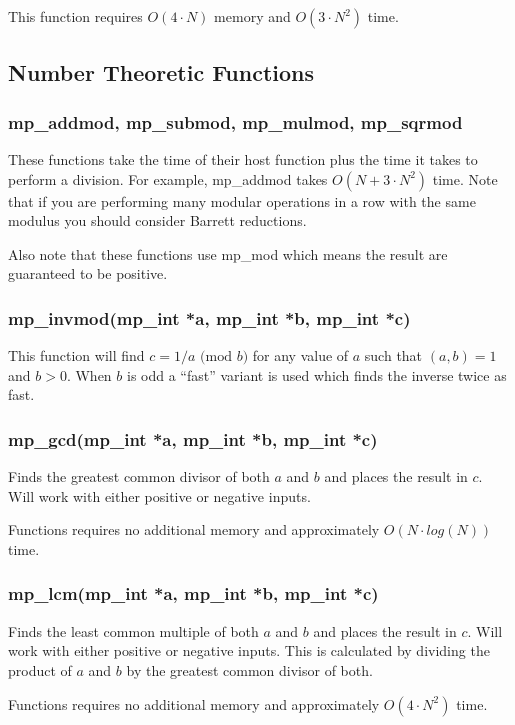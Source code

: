 \documentclass{article}
\begin{document}
This function requires $O(4 \cdot N)$ memory and $O(3 \cdot N^2)$ time.

\subsection{Number Theoretic Functions}

\subsubsection{mp\_addmod, mp\_submod, mp\_mulmod, mp\_sqrmod}
These functions take the time of their host function plus the time it takes to perform a division.  For example, 
mp\_addmod takes $O(N + 3 \cdot N^2)$ time.  Note that if you are performing many modular operations in a row with
the same modulus you should consider Barrett reductions.  

Also note that these functions use mp\_mod which means the result are guaranteed to be positive.

\subsubsection{mp\_invmod(mp\_int *a, mp\_int *b, mp\_int *c)}
This function will find $c = 1/a \mbox{ (mod }b\mbox{)}$ for any value of $a$ such that $(a, b) = 1$ and $b > 0$.  When
$b$ is odd a ``fast'' variant is used which finds the inverse twice as fast.  

\subsubsection{mp\_gcd(mp\_int *a, mp\_int *b, mp\_int *c)}
Finds the greatest common divisor of both $a$ and $b$ and places the result in $c$.  Will work with either positive
or negative inputs.  

Functions requires no additional memory and approximately $O(N \cdot log(N))$ time.

\subsubsection{mp\_lcm(mp\_int *a, mp\_int *b, mp\_int *c)}
Finds the least common multiple of both $a$ and $b$ and places the result in $c$.  Will work with either positive
or negative inputs.  This is calculated by dividing the product of $a$ and $b$ by the greatest common divisor of 
both.  

Functions requires no additional memory and approximately $O(4 \cdot N^2)$ time.
\end{document}
